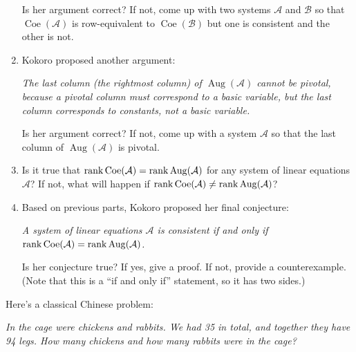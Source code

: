 \begin{exercises}
\begin{problist}
\begin{enumerate}
      Is her argument correct? If not, come up with two systems $\mathcal{A}$ and $\mathcal{B}$ so that $\operatorname{Coe}(\mathcal{A})$ is row-equivalent to $\operatorname{Coe}(\mathcal{B})$ but one is consistent and the other is not.
      \item Kokoro proposed another argument:
      
      \emph{The last column (the rightmost column) of $\operatorname{Aug}(\mathcal{A})$ cannot be pivotal, because a pivotal column must correspond to a basic variable, but the last column corresponds to constants, not a basic variable.}
      
      Is her argument correct? If not, come up with a system \(\mathcal{A}\) so that the last column of  \(\operatorname{Aug}(\mathcal{A})\) is pivotal.
      \item Is it true that $\operatorname{rank}\operatorname{Coe}(\mathcal{A})=\operatorname{rank}\operatorname{Aug}(\mathcal{A})$ for any system of linear equations $\mathcal{A}$? If not, what will happen if $\operatorname{rank}\operatorname{Coe}(\mathcal{A})\ne\operatorname{rank}\operatorname{Aug}(\mathcal{A})$?
      \item Based on previous parts, Kokoro proposed her final conjecture:
      
      \emph{A system of linear equations $\mathcal{A}$ is consistent if and only if $\operatorname{rank}\operatorname{Coe}(\mathcal{A})=\operatorname{rank}\operatorname{Aug}(\mathcal{A})$.}
      
      Is her conjecture true? If yes, give a proof. If not, provide a counterexample. (Note that this is a ``if and only if'' statement, so it has two sides.)
    \end{enumerate}
    
    
    \prob Here's a classical Chinese problem:
    
    \emph{In the cage were chickens and rabbits. We had 35 in total, and together they have 94 legs. How many chickens and how many rabbits were in the cage?}
    

\end{problist}
\end{exercises}
